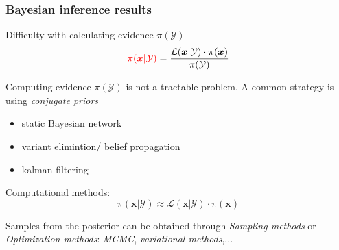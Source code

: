 \begin{frame}
\frametitle{Bayesian inference results}
\begin{block}{Difficulty with calculating evidence $\pi(\mathcal{Y})$}
\begin{equation*}               
\textcolor{red}{\pi(\boldsymbol{x}|\mathcal{Y})} = 
\frac{{\mathcal{L}(\boldsymbol{x}|\mathcal{Y})} \cdot \pi(\boldsymbol{x})}{{\pi(\mathcal{Y})}}
\end{equation*}
\end{block}

Computing evidence ${\pi(\mathcal{Y})}$ is not a tractable problem. A common strategy is using \textit{conjugate priors}  
\begin{itemize}
    \item static Bayesian network
    \item variant elimintion/ belief propagation
    \item kalman filtering
\end{itemize}

\begin{block}{Computational methods:}
 \begin{equation*}               \pi(\boldsymbol{x}|\mathcal{Y}) \approx 
{\mathcal{L}(\boldsymbol{x}|\mathcal{Y}) \cdot \pi(\boldsymbol{x})}
\end{equation*}     
\end{block}
Samples from the posterior can be obtained through \textit{Sampling methods} or \textit{Optimization methods}: \textit{MCMC}, \textit{variational methods},...
\end{frame}
